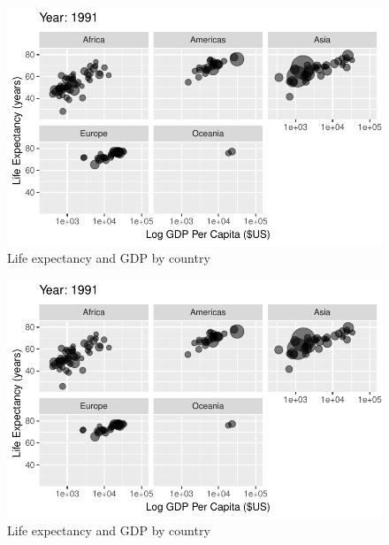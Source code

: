 \documentclass[
  letterpaper,
  DIV=11,
  numbers=noendperiod]{scrreport}
\theoremstyle{definition}
\theoremstyle{remark}
\begin{document}
\begin{figure}

{\centering \includegraphics{index_files/figure-pdf/fig-anim-lifegdp-71.pdf}

}

\caption{\label{fig-anim-lifegdp-71}Life expectancy and GDP by country}

\end{figure}

\begin{figure}

{\centering \includegraphics{index_files/figure-pdf/fig-anim-lifegdp-72.pdf}

}

\caption{\label{fig-anim-lifegdp-72}Life expectancy and GDP by country}

\end{figure}
\end{document}
